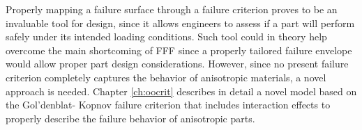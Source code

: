 \documentclass[main.tex]{subfiles}
\begin{document}
Properly mapping a failure surface through a failure criterion proves to be an invaluable tool for design, since it allows engineers to assess if a part will perform safely under its intended loading conditions. Such tool could in theory help overcome the main shortcoming of FFF since a properly tailored failure envelope would allow proper part design considerations. However, since no present failure criterion completely captures the behavior of anisotropic materials, a novel approach is needed. Chapter \ref{ch:oocrit} describes in detail a novel model based on the Gol'denblat- Kopnov failure criterion that includes interaction effects to properly describe the failure behavior of anisotropic parts.
% 
%
%

\end{document}
